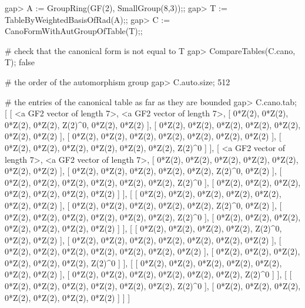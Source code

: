 \beginexample
gap> A := GroupRing(GF(2), SmallGroup(8,3));;
gap> T := TableByWeightedBasisOfRad(A);;
gap> C := CanoFormWithAutGroupOfTable(T);;

# check that the canonical form is not equal to T
gap> CompareTables(C.cano, T);
false

# the order of the automorphism group
gap> C.auto.size;
512

# the entries of the canonical table as far as they are bounded
gap> C.cano.tab;
[ [ <a GF2 vector of length 7>, <a GF2 vector of length 7>, 
      [ 0*Z(2), 0*Z(2), 0*Z(2), 0*Z(2), Z(2)^0, 0*Z(2), 0*Z(2) ], 
      [ 0*Z(2), 0*Z(2), 0*Z(2), 0*Z(2), 0*Z(2), 0*Z(2), 0*Z(2) ], 
      [ 0*Z(2), 0*Z(2), 0*Z(2), 0*Z(2), 0*Z(2), 0*Z(2), 0*Z(2) ], 
      [ 0*Z(2), 0*Z(2), 0*Z(2), 0*Z(2), 0*Z(2), 0*Z(2), Z(2)^0 ] ], 
  [ <a GF2 vector of length 7>, <a GF2 vector of length 7>, 
      [ 0*Z(2), 0*Z(2), 0*Z(2), 0*Z(2), 0*Z(2), 0*Z(2), 0*Z(2) ], 
      [ 0*Z(2), 0*Z(2), 0*Z(2), 0*Z(2), 0*Z(2), Z(2)^0, 0*Z(2) ], 
      [ 0*Z(2), 0*Z(2), 0*Z(2), 0*Z(2), 0*Z(2), 0*Z(2), Z(2)^0 ], 
      [ 0*Z(2), 0*Z(2), 0*Z(2), 0*Z(2), 0*Z(2), 0*Z(2), 0*Z(2) ] ], 
  [ [ 0*Z(2), 0*Z(2), 0*Z(2), 0*Z(2), 0*Z(2), 0*Z(2), 0*Z(2) ], 
      [ 0*Z(2), 0*Z(2), 0*Z(2), 0*Z(2), 0*Z(2), Z(2)^0, 0*Z(2) ], 
      [ 0*Z(2), 0*Z(2), 0*Z(2), 0*Z(2), 0*Z(2), 0*Z(2), Z(2)^0 ], 
      [ 0*Z(2), 0*Z(2), 0*Z(2), 0*Z(2), 0*Z(2), 0*Z(2), 0*Z(2) ] ], 
  [ [ 0*Z(2), 0*Z(2), 0*Z(2), 0*Z(2), Z(2)^0, 0*Z(2), 0*Z(2) ], 
      [ 0*Z(2), 0*Z(2), 0*Z(2), 0*Z(2), 0*Z(2), 0*Z(2), 0*Z(2) ], 
      [ 0*Z(2), 0*Z(2), 0*Z(2), 0*Z(2), 0*Z(2), 0*Z(2), 0*Z(2) ], 
      [ 0*Z(2), 0*Z(2), 0*Z(2), 0*Z(2), 0*Z(2), 0*Z(2), Z(2)^0 ] ], 
  [ [ 0*Z(2), 0*Z(2), 0*Z(2), 0*Z(2), 0*Z(2), 0*Z(2), 0*Z(2) ], 
      [ 0*Z(2), 0*Z(2), 0*Z(2), 0*Z(2), 0*Z(2), 0*Z(2), Z(2)^0 ] ], 
  [ [ 0*Z(2), 0*Z(2), 0*Z(2), 0*Z(2), 0*Z(2), 0*Z(2), Z(2)^0 ], 
      [ 0*Z(2), 0*Z(2), 0*Z(2), 0*Z(2), 0*Z(2), 0*Z(2), 0*Z(2) ] ] ]
\endexample
